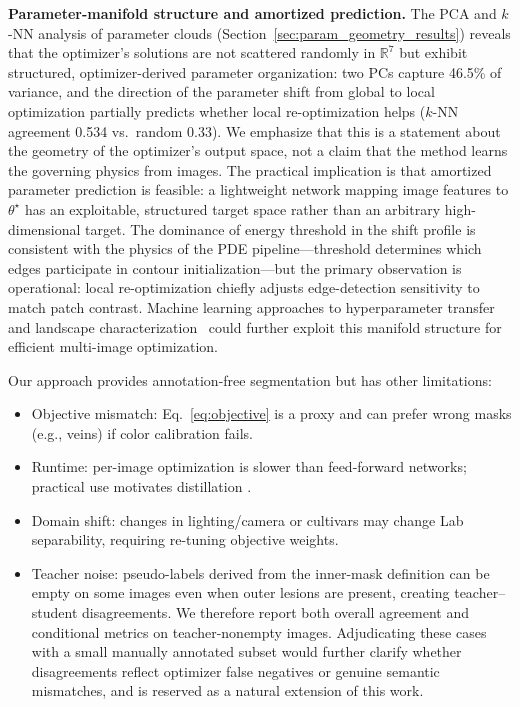 \documentclass[journal]{IEEEtran}
\newcommand{\R}{\mathbb{R}}
\begin{document}
\textbf{Parameter-manifold structure and amortized prediction.}
The PCA and $k$-NN analysis of parameter clouds (Section~\ref{sec:param_geometry_results}) reveals that the optimizer's solutions are not scattered randomly in $\R^7$ but exhibit structured, optimizer-derived parameter organization: two PCs capture 46.5\% of variance, and the direction of the parameter shift from global to local optimization partially predicts whether local re-optimization helps ($k$-NN agreement 0.534 vs.\ random 0.33). We emphasize that this is a statement about the geometry of the optimizer's output space, not a claim that the method learns the governing physics from images. The practical implication is that amortized parameter prediction is feasible: a lightweight network mapping image features to $\theta^\star$ has an exploitable, structured target space rather than an arbitrary high-dimensional target. The dominance of energy threshold in the shift profile is consistent with the physics of the PDE pipeline---threshold determines which edges participate in contour initialization---but the primary observation is operational: local re-optimization chiefly adjusts edge-detection sensitivity to match patch contrast. Machine learning approaches to hyperparameter transfer and landscape characterization~\cite{yu2020hyperparam,singh2016machine} could further exploit this manifold structure for efficient multi-image optimization.

Our approach provides annotation-free segmentation but has other limitations:
\begin{itemize}
    \item Objective mismatch: Eq.~\eqref{eq:objective} is a proxy and can prefer wrong masks (e.g., veins) if color calibration fails.
    \item Runtime: per-image optimization is slower than feed-forward networks; practical use motivates distillation \cite{hinton2015distilling}.
    \item Domain shift: changes in lighting/camera or cultivars may change Lab separability, requiring re-tuning objective weights.
    \item Teacher noise: pseudo-labels derived from the inner-mask definition can be empty on some images even when outer lesions are present, creating teacher--student disagreements. We therefore report both overall agreement and conditional metrics on teacher-nonempty images. Adjudicating these cases with a small manually annotated subset would further clarify whether disagreements reflect optimizer false negatives or genuine semantic mismatches, and is reserved as a natural extension of this work.
\end{itemize}
\end{document}
